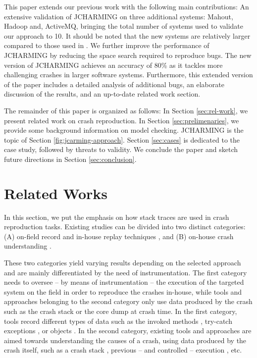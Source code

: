 \documentclass[times]{smrauth}
\begin{document}
This paper extends our previous work \cite{Nayrolles2015} with the following main contributions: An extensive validation of JCHARMING on three additional systems: Mahout, Hadoop and, ActiveMQ, bringing the total number of systems used to validate our approach to 10. It should be noted that the new systems are relatively larger compared to those used in \cite{Nayrolles2015}. We further improve the performance of JCHARMING by reducing the space search required to reproduce bugs. The new version of JCHARMING achieves an accuracy of 80\% as it tackles more challenging crashes in larger software systems. Furthermore, this extended version of the paper includes a detailed analysis of additional bugs, an elaborate discussion of the results, and an up-to-date related work section.

The remainder of this paper is organized as follows: In Section
\ref{sec:rel-work}, we present related work on crash reproduction. In Section \ref{sec:prelimenaries}, we provide some background information on model
checking. JCHARMING is the topic of Section \ref{fig:jcarming-approach}. Section \ref{sec:cases}
is dedicated to the case study, followed by threats to validity.
We conclude the paper and sketch future directions in Section
\ref{sec:conclusion}.


\section{Related Works\label{sec:rel-work}}

In this section, we put the emphasis on how stack traces are used in crash reproduction tasks. 
Existing studies can be divided into two distinct categories: (A) on-field record and in-house replay techniques \cite{Steven2000,Narayanasamy2005,Artzi2008,Roehm2015}, and (B) on-house crash understanding \cite{Jin2012,Jin2013,Zuddas2014,Chen2013a,Nayrolles2015}. 

These two categories yield varying results depending on the selected approach and are mainly differentiated by the need of instrumentation. 
The first category needs to oversee -- by means of instrumentation -- the execution of the targeted system on the field in order to reproduce the crashes in-house, while tools and approaches belonging to the second category only use data produced by the crash such as the crash stack or the core dump at crash time. In the first category, tools record different types of data such as the invoked methods \cite{Narayanasamy2005}, try-catch exceptions \cite{Rossler2013}, or objects \cite{Jaygarl}. In the second category, existing tools and approaches are aimed towards understanding the causes of a crash, using data produced by the crash itself, such as a crash stack \cite{Chen2013a}, previous -- and controlled -- execution \cite{Zuddas2014}, etc. 
\end{document}
